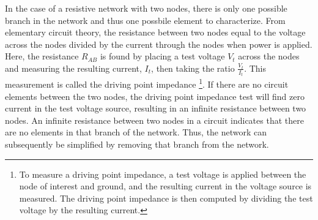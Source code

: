 \documentclass[11pt, a4paper]{article}
\begin{document}
In the case of a resistive network with two nodes, there is only one possible branch in the network and thus one possbile element to characterize.
From elementary circuit theory, the resistance between two nodes equal to the voltage across the nodes divided by the current through the nodes when power is applied.  
Here, the resistance $R_{AB}$ is found by placing a test voltage $V_t$ across the nodes and measuring the resulting current, $I_t$, then taking the ratio $\frac{V_t}{I_t}$.
This measurement is called the driving point impedance \footnote{To measure a driving point impedance, a test voltage is applied between the node of interest and ground, and the resulting current in the voltage source is measured. 
The driving point impedance is then computed by dividing the test voltage by the resulting current.}.
If there are no circuit elements between the two nodes, the driving point impedance test will find zero current in the test voltage source, resulting in an infinite resistance between two nodes.
An infinite resistance between two nodes in a circuit indicates that there are no elements in that branch of the network.
Thus, the network can subsequently be simplified by removing that branch from the network.
\end{document}
